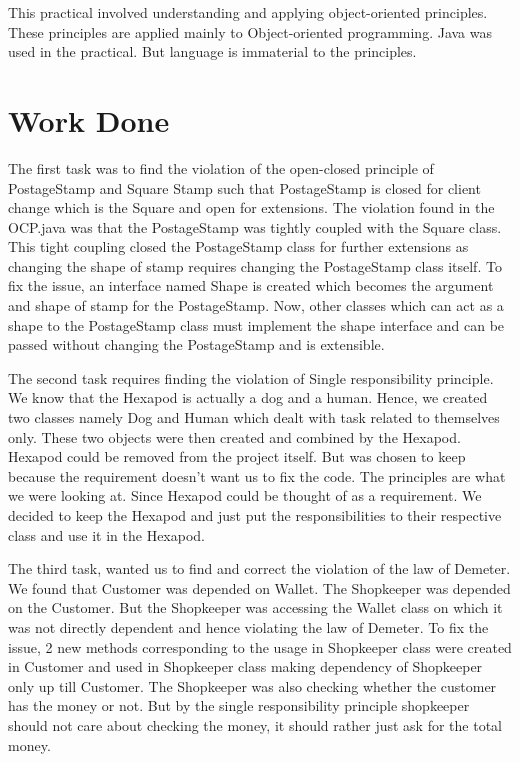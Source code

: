 This practical involved understanding and applying object-oriented principles. These principles are applied mainly to Object-oriented programming. Java was used in the practical. But language is immaterial to the principles.

\section{Work Done}

The first task was to find the violation of the open-closed principle of PostageStamp and Square Stamp such that PostageStamp is closed for client change which is the Square and open for extensions. The violation found in the OCP.java was that the PostageStamp was tightly coupled with the Square class. This tight coupling closed the PostageStamp class for further extensions as changing the shape of stamp requires changing the PostageStamp class itself. To fix the issue, an interface named Shape is created which becomes the argument and shape of stamp for the PostageStamp. Now, other classes which can act as a shape to the PostageStamp class must implement the shape interface and can be passed without changing the PostageStamp and is extensible.

The second task requires finding the violation of Single responsibility principle. We know that the Hexapod is actually a dog and a human. Hence, we created two classes namely Dog and Human which dealt with task related to themselves only. These two objects were then created and combined by the Hexapod. Hexapod could be removed from the project itself. But was chosen to keep because the requirement doesn't want us to fix the code. The principles are what we were looking at. Since Hexapod could be thought of as a requirement. We decided to keep the Hexapod and just put the responsibilities to their respective class and use it in the Hexapod.

The third task, wanted us to find and correct the violation of the law of Demeter. We found that Customer was depended on Wallet. The Shopkeeper was depended on the Customer. But the Shopkeeper was accessing the Wallet class on which it was not directly dependent and hence violating the law of Demeter. To fix the issue, 2 new methods corresponding to the usage in Shopkeeper class were created in Customer and used in Shopkeeper class making dependency of Shopkeeper only up till Customer. The Shopkeeper was also checking whether the customer has the money or not. But by the single responsibility principle shopkeeper should not care about checking the money, it should rather just ask for the total money.

